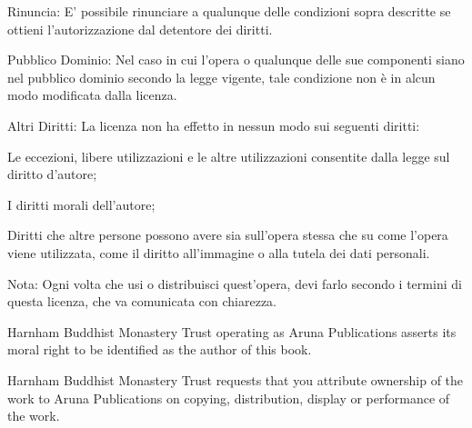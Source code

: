 {\begin{packeditemize}
\item Rinuncia: E' possibile rinunciare a qualunque delle condizioni sopra descritte se ottieni l'autorizzazione dal detentore dei diritti.
\item Pubblico Dominio: Nel caso in cui l'opera o qualunque delle sue componenti siano nel pubblico dominio secondo la legge vigente, tale condizione non è in alcun modo modificata dalla licenza.
\item Altri Diritti: La licenza non ha effetto in nessun modo sui seguenti diritti:
\begin{packeditemize}
\item Le eccezioni, libere utilizzazioni e le altre utilizzazioni consentite dalla legge sul diritto d'autore;
\item I diritti morali dell'autore;
\item Diritti che altre persone possono avere sia sull'opera stessa che su come l'opera viene utilizzata, come il diritto all'immagine o alla tutela dei dati personali.
\end{packeditemize}
\item Nota: Ogni volta che usi o distribuisci quest'opera, devi farlo secondo i termini di questa licenza, che va comunicata con chiarezza.
\end{packeditemize}

Harnham Buddhist Monastery Trust operating as Aruna Publications asserts its moral right to be identified as the author of this book.

Harnham Buddhist Monastery Trust requests that you attribute ownership of the work to Aruna Publications on copying, distribution, display or performance of the work.

}
